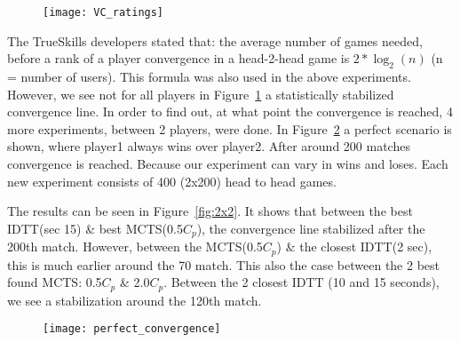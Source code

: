\documentclass{article}
\begin{document}
\begin{figure}[H]
\centering
\texttt{[image: VC\_ratings]}
\label{fig:convergenc_M_IDTT}
\end{figure}
The TrueSkills developers stated that: the average number of games needed, before a rank of a player convergence in a head-2-head game is $2 *\log_2(n)$ (n = number of users). This formula was also used in the above experiments. However, we see not for all players in Figure~\ref{fig:convergenc_M_IDTT} a statistically stabilized convergence line. In order to find out, at what point the convergence is reached, 4 more experiments, between 2 players, were done. In Figure~\ref{fig:super_con} a perfect scenario is shown, where player1 always wins over player2. After around 200 matches convergence is reached. Because our experiment can vary in wins and loses. Each new experiment consists of 400 (2x200) head to head games.

The results can be seen in Figure~\ref{fig:2x2}. It shows that between the best IDTT(sec 15) \& best MCTS(0.5$C_p$), the convergence line stabilized after the 200th match. However, between the MCTS(0.5$C_p$) \& the closest IDTT(2 sec), this is much earlier around the 70 match. This also the case between the 2 best found MCTS: 0.5$C_p$ \& 2.0$C_p$. Between the 2 closest IDTT (10 and 15 seconds), we see a stabilization around the 120th match.

\begin{figure}[H]
\centering
\texttt{[image: perfect\_convergence]}
\label{fig:super_con}
\end{figure}
\end{document}
